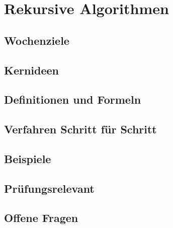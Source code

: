\chapter{Rekursive Algorithmen}
\label{kap:06-rekursive-algorithmen}

\section*{Wochenziele}
\begin{wochenziele}
\end{wochenziele}

\section{Kernideen}

\section{Definitionen und Formeln}

\section{Verfahren Schritt für Schritt}

\section{Beispiele}

\section{Prüfungsrelevant}

\section{Offene Fragen}
